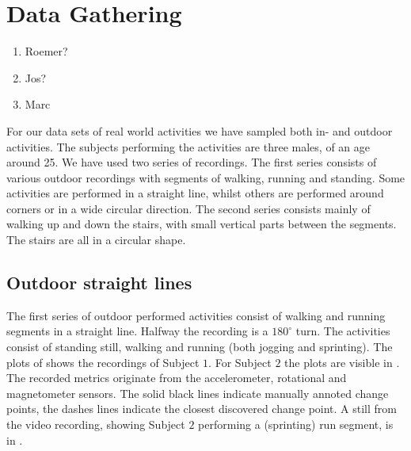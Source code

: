 \section{Data Gathering}\label{sec:data_gathering}
\begin{enumerate}
  \item Roemer?
  \item Jos?
  \item Marc
\end{enumerate}
For our data sets of real world activities we have sampled both in- and outdoor activities.
The subjects performing the activities are three males, of an age around 25.
We have used two series of recordings.
The first series consists of various outdoor recordings with segments of walking, running and standing.
Some activities are performed in a straight line, whilst others are performed around corners or in a wide circular direction.
The second series consists mainly of walking up and down the stairs, with small vertical parts between the segments.
The stairs are all in a circular shape.

\subsection{Outdoor straight lines}\label{subsec:outdoor_straight}
The first series of outdoor performed activities consist of walking and running segments in a straight line.
Halfway the recording is a $180^{\circ}$ turn.
The activities consist of standing still, walking and running (both jogging and sprinting).
The plots of  shows the recordings of Subject $1$.
For Subject $2$ the plots are visible in .
The recorded metrics originate from the accelerometer, rotational and magnetometer sensors.
The solid black lines indicate manually annoted change points, the dashes lines indicate the closest discovered change point.
A still from the video recording, showing Subject $2$ performing a (sprinting) run segment, is in .


